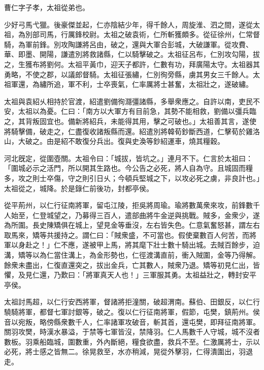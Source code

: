 \begin{pinyinscope}
 
 
 曹仁字子孝，太祖從弟也。
 
 
 少好弓馬弋獵。後豪傑並起，仁亦陰結少年，得千餘人，周旋淮、泗之間，遂從太祖，為別部司馬，行厲鋒校尉。太祖之破袁術，仁所斬獲頗多。從征徐州，仁常督騎，為軍前鋒。別攻陶謙將呂由，破之，還與大軍合彭城，大破謙軍。從攻費、華、即墨、開陽，謙遣別將救諸縣，仁以騎擊破之。太祖征呂布，仁別攻勾陽，拔之，生獲布將劉何。太祖平黃巾，迎天子都許，仁數有功，拜廣陽太守。太祖器其勇略，不使之郡，以議郎督騎。太祖征張繡，仁別徇旁縣，虜其男女三千餘人。太祖軍還，為繡所追，軍不利，士卒喪氣，仁率厲將士甚奮，太祖壯之，遂破繡。
 
 
 
 
 太祖與袁紹乆相持於官渡，紹遣劉備徇㶏彊諸縣，多舉衆應之。自許以南，吏民不安，太祖以為憂。仁曰：「南方以大軍方有目前急，其勢不能相救，劉備以彊兵臨之，其背叛固宜也。備新將紹兵，未能得其用，擊之可破也。」太祖善其言，遂使將騎擊備，破走之，仁盡復收諸叛縣而還。紹遣別將韓荀鈔斷西道，仁擊荀於雞洛山，大破之。由是紹不敢復分兵出。復與史渙等鈔紹運車，燒其糧穀。
 
 
 
 
 河北旣定，從圍壺關。太祖令曰：「城拔，皆坑之。」連月不下。仁言於太祖曰：「圍城必示之活門，所以開其生路也。今公告之必死，將人自為守。且城固而糧多，攻之則士卒傷，守之則引日乆；今頓兵堅城之下，以攻必死之虜，非良計也。」太祖從之，城降。於是錄仁前後功，封都亭侯。
 
 
 
 
 從平荊州，以仁行征南將軍，留屯江陵，拒吳將周瑜。瑜將數萬衆來攻，前鋒數千人始至，仁登城望之，乃募得三百人，遣部曲將牛金逆與挑戰。賊多，金衆少，遂為所圍。長史陳矯俱在城上，望見金等垂沒，左右皆失色。仁意氣奮怒甚，謂左右取馬來，矯等共援持之。謂仁曰：「賊衆盛，不可當也。假使棄數百人何苦，而將軍以身赴之！」仁不應，遂被甲上馬，將其麾下壯士數十騎出城。去賊百餘步，迫溝，矯等以為仁當住溝上，為金形勢也，仁徑渡溝直前，衝入賊圍，金等乃得解。餘衆未盡出，仁復直還突之，拔出金兵，亡其數人，賊衆乃退。矯等初見仁出，皆懼，及見仁還，乃歎曰：「將軍真天人也！」三軍服其勇。太祖益壯之，轉封安平亭侯。
 
 
 
 
 太祖討馬超，以仁行安西將軍，督諸將拒潼關，破超渭南。蘇伯、田銀反，以仁行驍騎將軍，都督七軍討銀等，破之。復以仁行征南將軍，假節，屯樊，鎮荊州。侯音以宛叛，略傍縣衆數千人，仁率諸軍攻破音，斬其首，還屯樊，即拜征南將軍。關羽攻樊，時漢水暴溢，于禁等七軍皆沒，禁降羽。仁人馬數千人守城，城不沒者數板。羽乘船臨城，圍數重，外內斷絕，糧食欲盡，救兵不至。仁激厲將士，示以必死，將士感之皆無二。徐晃救至，水亦稍減，晃從外擊羽，仁得潰圍出，羽退走。
 

\end{pinyinscope}
